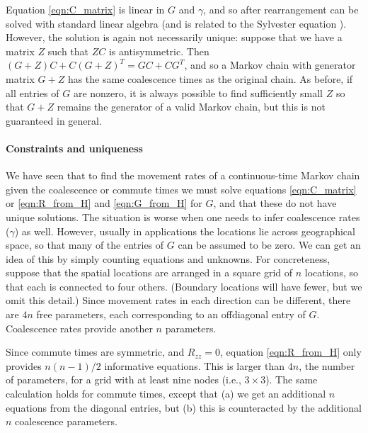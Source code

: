 \documentclass{article}
\begin{document}
Equation \eqref{eqn:C_matrix} is linear in $G$ and $\gamma$,
and so after rearrangement can be solved with standard linear algebra
(and is related to the Sylvester equation \citep{sylvester_eqn}).
However, the solution is again not necessarily unique:
suppose that we have a matrix $Z$ such that $ZC$ is antisymmetric.
Then $(G + Z) C + C (G + Z)^T = GC + CG^T$,
and so a Markov chain with generator matrix $G + Z$ has the same coalescence times
as the original chain.
As before, if all entries of $G$ are nonzero, 
it is always possible to find sufficiently small $Z$
so that $G + Z$ remains the generator of a valid Markov chain,
but this is not guaranteed in general.

\paragraph{Constraints and uniqueness}
We have seen that to find the movement rates of a continuous-time Markov chain
given the coalescence or commute times
we must solve equations \eqref{eqn:C_matrix} or \eqref{eqn:R_from_H} and \eqref{eqn:G_from_H} for $G$,
and that these do not have unique solutions.
The situation is worse when one needs to infer coalescence rates ($\gamma$) as well.
However, usually in applications the locations lie across geographical space,
so that many of the entries of $G$ can be assumed to be zero.
We can get an idea of this by simply counting equations and unknowns.
For concreteness, suppose that the spatial locations
are arranged in a square grid of $n$ locations,
so that each is connected to four others.
(Boundary locations will have fewer, but we omit this detail.)
Since movement rates in each direction can be different,
there are $4n$ free parameters, each corresponding to an offdiagonal entry of $G$.
Coalescence rates provide another $n$ parameters.

Since commute times are symmetric, and $R_{zz} = 0$, 
equation \eqref{eqn:R_from_H} only provides $n (n-1)/2$ informative equations.
This is larger than $4n$, the number of parameters,
for a grid with at least nine nodes (i.e., $3 \times 3$).
The same calculation holds for commute times, 
except that (a) we get an additional $n$ equations from the diagonal entries,
but (b) this is counteracted by the additional $n$ coalescence parameters.
\end{document}
